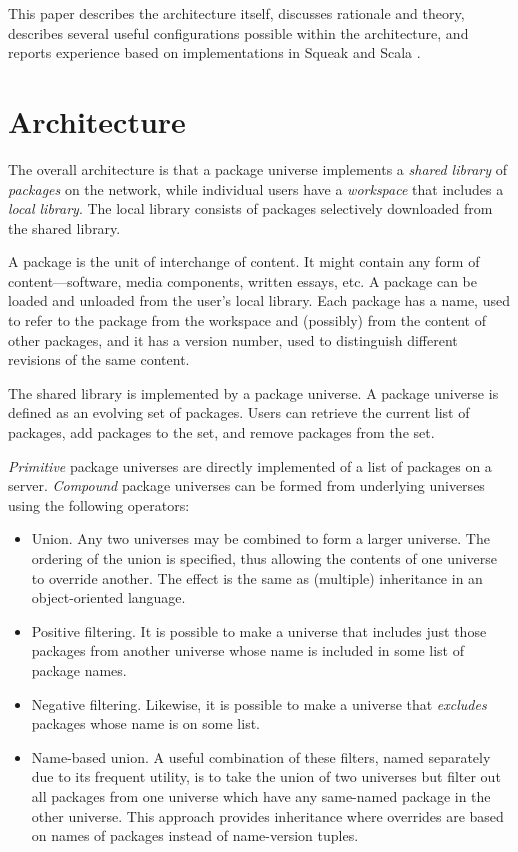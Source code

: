 \documentclass{IEEEtran}
\begin{document}
This paper describes the architecture itself, discusses rationale and
theory, describes several useful configurations possible within the
architecture, and reports experience based on implementations in
Squeak \cite{ingalls97:future} and Scala \cite{odersky04:scala}.


\section{Architecture}
The overall architecture is that a package universe implements a
\emph{shared library} of \emph{packages} on the network, while
individual users have a \emph{workspace} that includes a \emph{local
library}.  The local library consists of packages selectively
downloaded from the shared library.

A package is the unit of interchange of content.  It might contain any
form of content---software, media components, written essays, etc.  A
package can be loaded and unloaded from the user's local library.
Each package has a name, used to refer to the package from the
workspace and (possibly) from the content of other packages, and it
has a version number, used to distinguish different revisions of the same
content.

The shared library is implemented by a package universe.  A package
universe is defined as an evolving set of packages.  Users can
retrieve the current list of packages, add packages to the set, and
remove packages from the set.

\emph{Primitive} package universes are directly implemented of a list
of packages on a server.  \emph{Compound} package universes can be
formed from underlying universes using the following operators:
\begin{itemize}
\item Union.  Any two universes may be combined to form a larger
      universe.  The ordering of the union is specified, thus allowing
      the contents of one universe to override another.  The effect
      is the same as (multiple) inheritance in an object-oriented language.

\item Positive filtering.  It is possible to make a universe that
      includes just those packages from another universe whose
      name is included in some list of package names.

\item Negative filtering.  Likewise, it is possible to make a universe
      that \emph{excludes} packages whose name is on some list.

\item Name-based union.  A useful combination of these filters, named
      separately due to its frequent utility, is to take the union of
      two universes but filter out all packages from one universe
      which have any same-named package in the other universe.  This
      approach provides inheritance where overrides are based on names
      of packages instead of name-version tuples.
\end{itemize}
\end{document}
